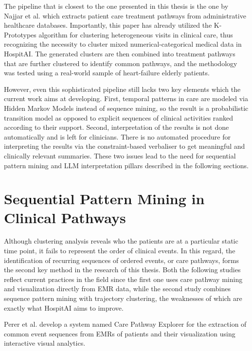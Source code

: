The pipeline that is closest to the one presented in this thesis is the one by Najjar et al. \cite{najjar2018} which extracts patient care treatment pathways from administrative healthcare databases. Importantly, this paper has already utilized the K-Prototypes algorithm for clustering heterogeneous visits in clinical care, thus recognizing the necessity to cluster mixed numerical-categorical medical data in HospitAI. The generated clusters are then combined into treatment pathways that are further clustered to identify common pathways, and the methodology was tested using a real-world sample of heart-failure elderly patients.

However, even this sophisticated pipeline still lacks two key elements which the current work aims at developing. First, temporal patterns in care are modeled via Hidden Markov Models instead of sequence mining, so the result is a probabilistic transition model as opposed to explicit sequences of clinical activities ranked according to their support. Second, interpretation of the results is not done automatically and is left for clinicians. There is no automated procedure for interpreting the results via the constraint-based verbaliser to get meaningful and clinically relevant summaries. These two issues lead to the need for sequential pattern mining and LLM interpretation pillars described in the following sections.

\section{Sequential Pattern Mining in Clinical Pathways}\label{sec:rw_sequences}

Although clustering analysis reveals who the patients are at a particular static time point, it fails to represent the order of clinical events. In this regard, the identification of recurring sequences of ordered events, or care pathways, forms the second key method in the research of this thesis. Both the following studies reflect current practices in the field since the first one uses care pathway mining and visualization directly from EMR data, while the second study combines sequence pattern mining with trajectory clustering, the weaknesses of which are exactly what HospitAI aims to improve.

Perer et al. \cite{perer2015} develop a system named Care Pathway Explorer for the extraction of common event sequences from EMRs of patients and their visualization using interactive visual analytics.

